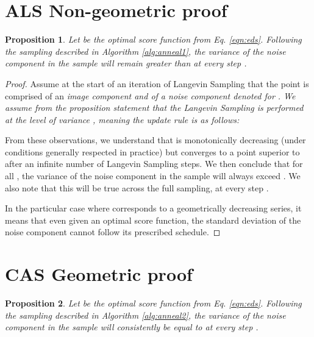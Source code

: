\documentclass{article} \usepackage{iclr2021_conference_notitle,times}
\theoremstyle{definition}
\theoremstyle{definition}
\newtheorem{proposition}{Proposition}
\begin{document}
\section{ALS Non-geometric proof}\label{app:als_bad_proof}

\addtocounter{proposition}{-3}
\begin{proposition}
\em 
Let  be the optimal score function from Eq. \ref{eqn:eds}. Following the sampling described in Algorithm \ref{alg:anneal1}, the variance of the noise component in the sample  will remain greater than  at every step .\em 
\end{proposition}


\begin{proof}
Assume at the start of an iteration of Langevin Sampling that the point  is comprised of an \em image component \em and of a \em noise component \em denoted  for . We assume from the proposition statement that the Langevin Sampling is performed at the level of variance , meaning the update rule is as follows:
\vspace{-0.1cm}

From these observations, we understand that  is monotonically decreasing (under conditions generally respected in practice) but converges to a point superior to  after an infinite number of Langevin Sampling steps. 
We then conclude that for all , the variance of the noise component in the sample will always exceed . We also note that this will be true across the full sampling, at every step .

In the particular case where  corresponds to a geometrically decreasing series, it means that even given an optimal score function, the standard deviation of the noise component cannot follow its prescribed schedule.

\end{proof}



 
\section{CAS Geometric proof}\label{app:cas_good_proof}

\begin{proposition}
\em Let  be the optimal score function from Eq. \ref{eqn:eds}. Following the sampling described in Algorithm \ref{alg:anneal2}, the variance of the noise component in the sample  will consistently be equal to  at every step . \em 
\end{proposition}
\end{document}
